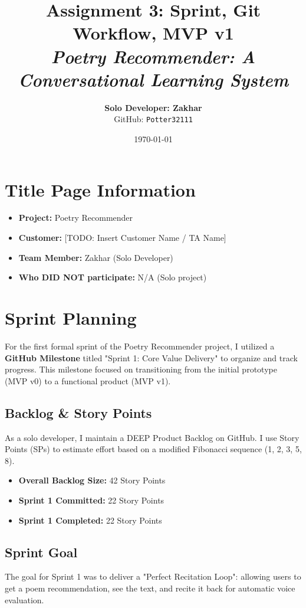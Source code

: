 \documentclass[12pt]{article}
\title{
    \huge \textbf{Assignment 3: Sprint, Git Workflow, MVP v1} \\
    \vspace{0.5cm}
    \large \textit{Poetry Recommender: A Conversational Learning System}
}
\author{
    \textbf{Solo Developer: Zakhar} \\
    GitHub: \texttt{Potter32111}
}
\date{\today}
\begin{document}
\maketitle

\section*{Title Page Information}
\begin{itemize}
    \item \textbf{Project:} Poetry Recommender
    \item \textbf{Customer:} [TODO: Insert Customer Name / TA Name]
    \item \textbf{Team Member:} Zakhar (Solo Developer)
    \item \textbf{Who DID NOT participate:} N/A (Solo project)
\end{itemize}

\newpage

\section{Sprint Planning}

For the first formal sprint of the Poetry Recommender project, I utilized a \textbf{GitHub Milestone} titled "Sprint 1: Core Value Delivery" to organize and track progress. This milestone focused on transitioning from the initial prototype (MVP v0) to a functional product (MVP v1).

\subsection{Backlog & Story Points}
As a solo developer, I maintain a DEEP Product Backlog on GitHub. I use Story Points (SPs) to estimate effort based on a modified Fibonacci sequence (1, 2, 3, 5, 8).

\begin{itemize}
    \item \textbf{Overall Backlog Size:} 42 Story Points
    \item \textbf{Sprint 1 Committed:} 22 Story Points
    \item \textbf{Sprint 1 Completed:} 22 Story Points
\end{itemize}

\subsection{Sprint Goal}
The goal for Sprint 1 was to deliver a "Perfect Recitation Loop": allowing users to get a poem recommendation, see the text, and recite it back for automatic voice evaluation.
\end{document}
